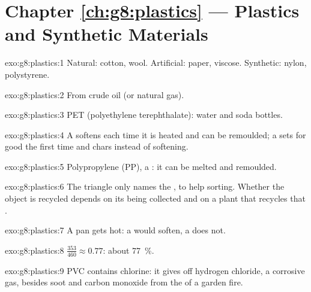 \section*{Chapter \ref{ch:g8:plastics} --- Plastics and Synthetic Materials}

\begin{solution}{exo:g8:plastics:1}
Natural: cotton, wool. Artificial: paper, viscose. Synthetic: nylon,
polystyrene.
\end{solution}

\begin{solution}{exo:g8:plastics:2}
From crude oil (or natural gas).
\end{solution}

\begin{solution}{exo:g8:plastics:3}
PET (polyethylene terephthalate): water and soda bottles.
\end{solution}

\begin{solution}{exo:g8:plastics:4}
A  softens each time it is heated and can be remoulded; a
 sets for good the first time and chars instead of softening.
\end{solution}

\begin{solution}{exo:g8:plastics:5}
Polypropylene (PP), a : it can be melted and remoulded.
\end{solution}

\begin{solution}{exo:g8:plastics:6}
The triangle only names the , to help sorting. Whether the object
is recycled depends on its being collected and on a plant that recycles
that .
\end{solution}

\begin{solution}{exo:g8:plastics:7}
A pan gets hot: a  would soften, a  does not.
\end{solution}

\begin{solution}{exo:g8:plastics:8}
$\frac{353}{460} \approx 0.77$: about \qty{77}{\percent}.
\end{solution}

\begin{solution}{exo:g8:plastics:9}
PVC contains chlorine:  it gives off hydrogen chloride, a
corrosive gas, besides soot and carbon monoxide from the  of a garden fire.
\end{solution}

